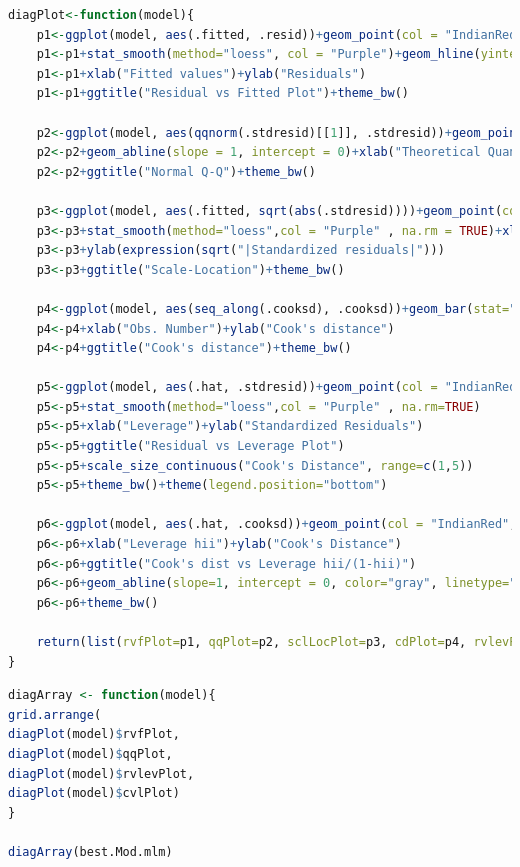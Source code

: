 \documentclass[
]{article}
\begin{document}
\begin{lstlisting}[language=R]
diagPlot<-function(model){
    p1<-ggplot(model, aes(.fitted, .resid))+geom_point(col = "IndianRed")
    p1<-p1+stat_smooth(method="loess", col = "Purple")+geom_hline(yintercept=0, col="red", linetype="dashed")
    p1<-p1+xlab("Fitted values")+ylab("Residuals")
    p1<-p1+ggtitle("Residual vs Fitted Plot")+theme_bw()
    
    p2<-ggplot(model, aes(qqnorm(.stdresid)[[1]], .stdresid))+geom_point(col = "IndianRed",na.rm = TRUE)
    p2<-p2+geom_abline(slope = 1, intercept = 0)+xlab("Theoretical Quantiles")+ylab("Standardized Residuals")
    p2<-p2+ggtitle("Normal Q-Q")+theme_bw()
    
    p3<-ggplot(model, aes(.fitted, sqrt(abs(.stdresid))))+geom_point(col = "IndianRed",na.rm=TRUE)
    p3<-p3+stat_smooth(method="loess",col = "Purple" , na.rm = TRUE)+xlab("Fitted Value")
    p3<-p3+ylab(expression(sqrt("|Standardized residuals|")))
    p3<-p3+ggtitle("Scale-Location")+theme_bw()
    
    p4<-ggplot(model, aes(seq_along(.cooksd), .cooksd))+geom_bar(stat="identity", position="identity")
    p4<-p4+xlab("Obs. Number")+ylab("Cook's distance")
    p4<-p4+ggtitle("Cook's distance")+theme_bw()
    
    p5<-ggplot(model, aes(.hat, .stdresid))+geom_point(col = "IndianRed", aes(size=.cooksd), na.rm=TRUE)
    p5<-p5+stat_smooth(method="loess",col = "Purple" , na.rm=TRUE)
    p5<-p5+xlab("Leverage")+ylab("Standardized Residuals")
    p5<-p5+ggtitle("Residual vs Leverage Plot")
    p5<-p5+scale_size_continuous("Cook's Distance", range=c(1,5))
    p5<-p5+theme_bw()+theme(legend.position="bottom")
    
    p6<-ggplot(model, aes(.hat, .cooksd))+geom_point(col = "IndianRed", na.rm=TRUE)+stat_smooth(method="loess",col = "Purple" , na.rm=TRUE)
    p6<-p6+xlab("Leverage hii")+ylab("Cook's Distance")
    p6<-p6+ggtitle("Cook's dist vs Leverage hii/(1-hii)")
    p6<-p6+geom_abline(slope=1, intercept = 0, color="gray", linetype="dashed")
    p6<-p6+theme_bw()
    
    return(list(rvfPlot=p1, qqPlot=p2, sclLocPlot=p3, cdPlot=p4, rvlevPlot=p5, cvlPlot=p6))
}
\end{lstlisting}

\begin{lstlisting}[language=R]
diagArray <- function(model){
grid.arrange(
diagPlot(model)$rvfPlot,
diagPlot(model)$qqPlot,
diagPlot(model)$rvlevPlot,
diagPlot(model)$cvlPlot)
}

diagArray(best.Mod.mlm)
\end{lstlisting}
\end{document}
